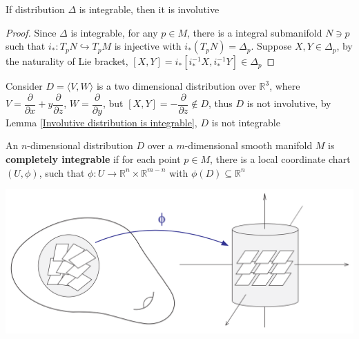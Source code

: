 \documentclass[../main.tex]{subfiles}
\begin{document}
\begin{lemma}\label{Involutive distribution is integrable}
If distribution $\Delta$ is integrable, then it is involutive
\end{lemma}

\begin{proof}
Since $\Delta$ is integrable, for any $p\in M$, there is a integral submanifold $N\ni p$ such that $i_*:T_pN\hookrightarrow T_pM$ is injective with $i_*(T_pN)=\Delta_p$. Suppose $X,Y\in\Delta_p$, by the naturality of Lie bracket, $[X,Y]=i_*[i_*^{-1}X,i_*^{-1}Y]\in\Delta_p$
\end{proof}

\begin{example}
Consider $D=\langle V,W\rangle$ is a two dimensional distribution over $\mathbb R^3$, where $V=\dfrac{\partial}{\partial x}+y\dfrac{\partial}{\partial z}$, $W=\dfrac{\partial}{\partial y}$, but $[X,Y]=-\dfrac{\partial}{\partial z}\notin D$, thus $D$ is not involutive, by Lemma \ref{Involutive distribution is integrable}, $D$ is not integrable
\end{example}

\begin{definition}
An $n$-dimensional distribution $D$ over a $m$-dimensional smooth manifold $M$ is \textbf{completely integrable} if for each point $p\in M$, there is a local coordinate chart $(U,\phi)$, such that $\phi:U\to\mathbb R^n\times\mathbb R^{m-n}$ with $\phi(D)\subseteq\mathbb R^n$
\begin{center}
\includegraphics[scale=0.2]{Pictures/Completely_integrable.png}
\end{center}
\end{definition}
\end{document}
